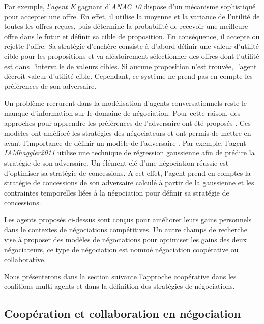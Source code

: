	Par exemple, \textit{l'agent K} gagnant d'\emph{ANAC 10} dispose d'un mécanisme sophistiqué pour accepter une offre. En effet, il utilise la moyenne et la variance de l'utilité de toutes les offres reçues, puis détermine la probabilité de recevoir une meilleure offre dans le futur et définit sa cible de proposition. En conséquence, il accepte ou rejette l'offre. Sa stratégie d'enchère consiste à d'abord définir une valeur d'utilité cible pour les propositions et va aléatoirement sélectionner des offres dont l'utilité est dans l'intervalle de valeurs cibles. Si aucune proposition n'est trouvée, l'agent décroît valeur d'utilité cible.	Cependant, ce système ne prend pas en compte les préférences de son adversaire. 
	
	Un problème recrurent dans la modélisation d'agents conversationnels reste le manque d'information sur le domaine de négociation. Pour cette raison, des approches pour apprendre les préférences de l'adversaire ont été proposés  \cite{ref}. Ces modèles ont amélioré les stratégies des négociateurs et ont permis de mettre en avant l'importance de définir un modèle de l'adversaire \cite{}. Par exemple, l'agent \textit{IAMhaggler2011} utilise une technique de régression gaussienne afin de prédire la stratégie de son adversaire. Un élément clé d'une négociation réussie est d'optimiser sa stratégie de concessions. A cet effet, l'agent prend en comptes la stratégie de concessions de son adversaire calculé à partir de la gaussienne et les contraintes temporelles liées à la négociation pour définir sa stratégie de concessions. 
	
	
	
	
	Les agents proposés ci-dessus sont conçus pour améliorer leurs gains personnels dans le contextes de négociations compétitives. Un autre champs de recherche vise à proposer des modèles de négociations pour optimiser les gains des deux négociateurs, ce type de négociation est nommé négociation coopérative ou collaborative. 
	
	Nous présenterons dans la section suivante l'approche coopérative dans les coalitions multi-agents et dans la définition des stratégies de négociations. 
	
		\subsection{Coopération et collaboration en négociation}
		
